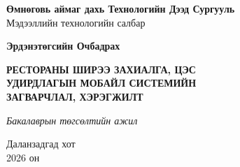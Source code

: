 \begin{titlepage}
\pagestyle{empty}
\centering

\vspace*{0.5cm}
{\large\bfseries Өмнөговь аймаг дахь Технологийн Дээд Сургууль}\\[6pt]
{\large Мэдээллийн технологийн салбар}

\vspace{3cm}
{\Large\bfseries Эрдэнэтөгсийн Очбадрах}

\vspace{2cm}
{\LARGE\bfseries РЕСТОРАНЫ ШИРЭЭ ЗАХИАЛГА, ЦЭС}\\[8pt]
{\LARGE\bfseries УДИРДЛАГЫН МОБАЙЛ СИСТЕМИЙН}\\[8pt]
{\LARGE\bfseries ЗАГВАРЧЛАЛ, ХЭРЭГЖИЛТ}

\vspace{2cm}
{\large\itshape Бакалаврын төгсөлтийн ажил}

\vfill
{\large Даланзадгад хот}\\[4pt]
{\large 2026 он}
\end{titlepage}
\clearpage

